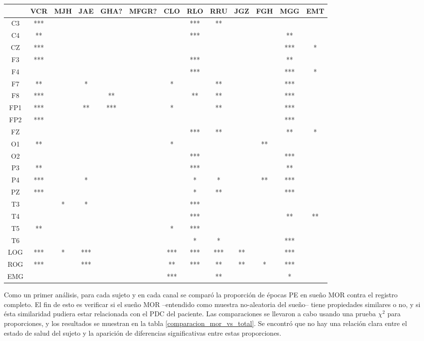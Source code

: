 \begin{SidewaysFigure}
\centering
\begin{tabular}{c||ccccc||cccc||ccc}
& VCR & MJH & JAE & GHA? & MFGR? & CLO & RLO & RRU & JGZ & FGH & MGG & EMT \\
\hline
 C3 & *** &&&&&& *** & ** &&&& \\
 C4 & ** &&&&&& *** &&&& ** & \\
 CZ & *** &&&&&&&&&& *** & *  \\
 F3 & *** &&&&&& *** &&&& ** & \\
 F4 &&&&&&& *** &&&& *** & *  \\
 F7 & ** && * &&& * && ** &&& *** & \\
 F8 & *** &&& ** &&& ** & ** &&& *** & \\
 FP1 & *** && ** & *** && * && ** &&& *** & \\
 FP2 & *** &&&&&&&&&& *** & \\
 FZ &&&&&&& *** & ** &&& ** & *  \\
 O1 & ** &&&&& * &&&& ** && \\
 O2 &&&&&&& *** &&&& *** & \\
 P3 & ** &&&&&& *** &&&& ** & \\
 P4 & *** && * &&&& * & * && ** & *** & \\
 PZ & *** &&&&&& * & ** &&& *** & \\
 T3 && * & * &&&& *** &&&&& \\
 T4 &&&&&&& *** &&&& ** & **  \\
 T5 & ** &&&&& * & *** &&&&& \\
 T6 &&&&&&& * & * &&& *** & \\
 LOG & *** & * & *** &&& *** & *** & *** & ** && *** & \\
 ROG & *** && *** &&& ** & *** & ** & ** & * & *** & \\
 EMG &&&&&& *** && ** &&& * &
\end{tabular}
\caption{Diferencias significativas en la comparaci\'on entre proporci\'on
de \'epocas PE en sue\~no MOR (fase R) y no-MOR (fases W y N)}
\label{comparacion_mor_vs_total}
\end{SidewaysFigure}

Como un primer an\'alisis, para cada sujeto y en cada canal 
se compar\'o la proporci\'on de \'epocas PE en sue\~no MOR contra el registro completo.
El fin de esto es verificar si el sue\~no MOR --entendido como muestra no-aleatoria
del sue\~no-- tiene propiedades similares o no, y si \'esta similaridad pudiera estar
relacionada con el PDC del paciente. 
Las comparaciones se llevaron a cabo usando una prueba $\chi^{2}$ para proporciones,
y los resultados se muestran en la tabla \ref{comparacion_mor_vs_total}.
Se encontr\'o que no hay una relaci\'on clara entre el estado de salud del sujeto y
la aparici\'on de diferencias significativas entre estas proporciones.

